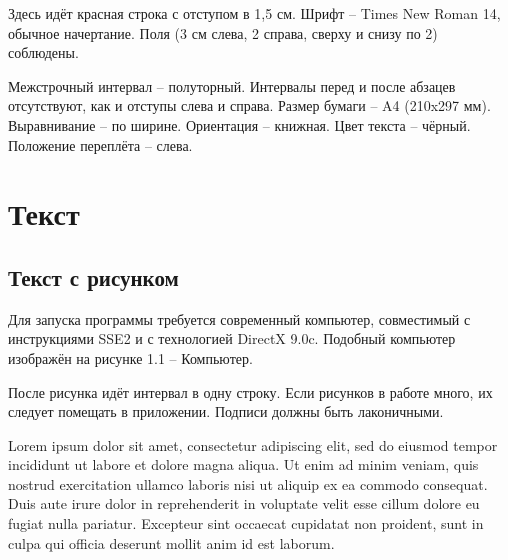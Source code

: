 \intro
Здесь идёт красная строка с отступом в 1,5 см. Шрифт – Times New Roman 14, обычное начертание. Поля (3 см слева, 2 справа, сверху и снизу по 2) соблюдены.

Межстрочный интервал – полуторный. Интервалы перед и после абзацев отсутствуют, как и отступы слева и справа. Размер бумаги – A4 (210x297 мм). Выравнивание – по ширине. Ориентация – книжная. Цвет текста – чёрный. Положение переплёта – слева.

\chapter{Текст}
\section{Текст с рисунком}
Для запуска программы требуется современный компьютер, совместимый с инструкциями SSE2 и с технологией DirectX 9.0c. Подобный компьютер изображён на рисунке 1.1 -- Компьютер.


После рисунка идёт интервал в одну строку. Если рисунков в работе много, их следует помещать в приложении. Подписи должны быть лаконичными.

\conclusion

Lorem ipsum dolor sit amet, consectetur adipiscing elit, sed do eiusmod tempor incididunt ut labore et dolore magna aliqua. Ut enim ad minim veniam, quis nostrud exercitation ullamco laboris nisi ut aliquip ex ea commodo consequat. Duis aute irure dolor in reprehenderit in voluptate velit esse cillum dolore eu fugiat nulla pariatur. Excepteur sint occaecat cupidatat non proident, sunt in culpa qui officia deserunt mollit anim id est laborum.
